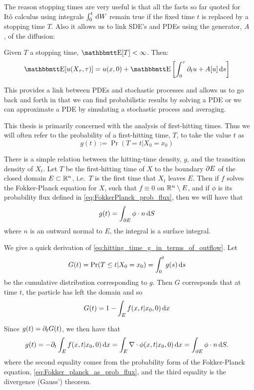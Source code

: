 The reason stopping times are very useful is that all the facts so far quoted
for It\^o calculus using integrals $\int_0^t \, \mathrm{d} W$ remain true if the
fixed time $t$ is replaced by a stopping time $T$. Also it allows us to link
SDE's and PDEs using the generator, $A$, of the diffusion: 
\begin{thm} Given $T$ a stopping time, $\Exp[T] < \infty$.
Then:
$$
\Exp[u(X_\t, \t)] =
u(x, 0) + \Exp\left[\int_0^\t \di_t u + A[u] \intd{s}
\right]
 $$
\end{thm}
This provides a link between PDEs and stochastic processes and allows us to go
back and forth in that we can find probabilistic results by
solving a PDE or we can approximate a PDE by simulating a stochastic process
and averaging.

This thesis is primarily concerned with the analysis of first-hitting times.
Thus we will often refer to the probability of a first-hitting time, $T$, to
take the value $t$ as
$$g(t) := \Pr(T = t|X_0 = x_0)$$

There is a simple relation between the hitting-time density, $g$, and the
transition density of $X_t$. Let $T$ be the first-hitting time of $X$ to the
boundary ${\partial} E$ of the closed domain $E\subset  { \mathbb{R} }^n$, i.e.\ $T$ is the first
time that $X_t$ leaves $E$.  
Then if $f$ solves the
Fokker-Planck equation for $X$, such that $f\equiv 0$ on ${ \mathbb{R} }^n \setminus E$, and
if $\phi$ is its probability flux defined in \cref{eq:FokkerPlanck_prob_flux}, then
we will have that
\begin{equation}
g(t) = \int_{{\partial} E} \phi \cdot n \, \mathrm{d} S
\label{eq:hitting_time_g_in_terms_of_outflow}
\end{equation}
where $n$ is an outward normal to $E$, the integral is a surface integral. 

We give a quick derivation of \cref{eq:hitting_time_g_in_terms_of_outflow}. Let
$$G(t) = \Pr(T\leq t | X_0=x_0) = \int_0^t g(s) \, \mathrm{d} s$$ be the cumulative
distribution corresponding to $g$. Then $G$ corresponds that at time $t$, the particle has
left the domain and so 
$$G(t) = 1- \int_E f(x,t|x_0,0) \, \mathrm{d} x$$

Since $g(t) = {\partial}_t G(t)$, we then have that  
$$g(t) = - {\partial}_t \int_E f(x,t|x_0,0) \, \mathrm{d} x = \int_E { \nabla } \cdot
\phi(x,t|x_0,0) \, \mathrm{d} x = \int_{{\partial} E} \phi \cdot n \, \mathrm{d} S.$$
where the second equality comes from the probability form of the Fokker-Planck equation,
\cref{eq:Fokker_planck_as_prob_flux}, and the third  equality is the divergence
(Gauss') theorem.

